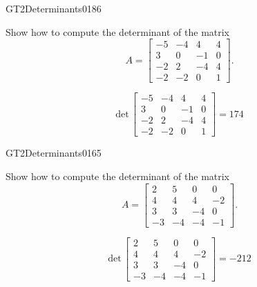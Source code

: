 \begin{exercise}{GT2}{Determinants}{0186} 
\begin{exerciseStatement} 

Show how to compute the determinant of the matrix \[A=\left[\begin{array}{cccc}
-5 & -4 & 4 & 4 \\
3 & 0 & -1 & 0 \\
-2 & 2 & -4 & 4 \\
-2 & -2 & 0 & 1
\end{array}\right].\]

 \end{exerciseStatement}
 \begin{exerciseAnswer} \[\mathrm{det}\,\left[\begin{array}{cccc}
-5 & -4 & 4 & 4 \\
3 & 0 & -1 & 0 \\
-2 & 2 & -4 & 4 \\
-2 & -2 & 0 & 1
\end{array}\right]=174\] \end{exerciseAnswer}
 \end{exercise}



\begin{exercise}{GT2}{Determinants}{0165} 
\begin{exerciseStatement} 

Show how to compute the determinant of the matrix \[A=\left[\begin{array}{cccc}
2 & 5 & 0 & 0 \\
4 & 4 & 4 & -2 \\
3 & 3 & -4 & 0 \\
-3 & -4 & -4 & -1
\end{array}\right].\]

 \end{exerciseStatement}
 \begin{exerciseAnswer} \[\mathrm{det}\,\left[\begin{array}{cccc}
2 & 5 & 0 & 0 \\
4 & 4 & 4 & -2 \\
3 & 3 & -4 & 0 \\
-3 & -4 & -4 & -1
\end{array}\right]=-212\] \end{exerciseAnswer}
 \end{exercise}


\newpage




